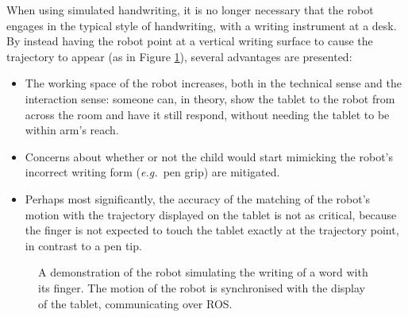 \documentclass{sig-alternate}
\newcommand{\eg}{{\textit{e.g.~}}}
\begin{document}
When using simulated handwriting, it is no longer necessary that the robot
engages in the typical style of handwriting, with a writing instrument at a desk.
By instead having the robot point at a vertical writing surface to cause the
trajectory to appear (as in Figure \ref{fig:naoWriting}), several advantages are
presented:

\begin{itemize}

    \item The working space of the robot increases, both in the technical sense
        and the interaction sense: someone can, in theory, show the tablet to
        the robot from across the room and have it still respond, without
        needing the tablet to be within arm's reach.

    \item Concerns about whether or not the child would start mimicking the
        robot's incorrect writing form (\eg pen grip) are mitigated. 

    \item Perhaps most significantly, the accuracy of the matching of the
        robot's motion with the trajectory displayed on the tablet is not as
        critical, because the finger is not expected to touch the tablet exactly
        at the trajectory point, in contrast to a pen tip.

\end{itemize}

\begin{figure}[thpb]
     \begin{center}
%
    \end{center}
    \caption{A demonstration of the robot simulating the writing of a word with
    its finger. The motion of the robot is synchronised with the display of the
    tablet, communicating over ROS.\protect\footnotemark}%

   \label{fig:naoWriting}
\end{figure}
\end{document}
